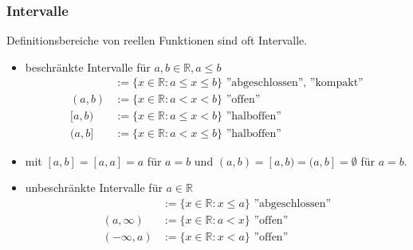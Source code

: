 \documentclass[12pt]{article}
\begin{document}
\subsubsection{Intervalle}
Definitionsbereiche von reellen Funktionen sind oft Intervalle. 
\begin{itemize}
    \item beschränkte Intervalle für $a, b \in \mathbb{R}, a \leq b$
    \begin{align*}
        [a,b] &:= \{x \in \mathbb{R} : a \leq x \leq b\} \text{ ''abgeschlossen'', ''kompakt''} \\
        (a,b) &:= \{x \in \mathbb{R} : a < x < b\} \text{ ''offen''} \\
        [a,b) &:= \{x \in \mathbb{R} : a \leq x < b\} \text{ ''halboffen''} \\
        (a,b] &:= \{x \in \mathbb{R} : a < x \leq b\} \text{ ''halboffen''} 
    \end{align*}
    \item[] mit $[a,b] = [a, a] = {a}$ für $a = b$ und $(a,b) = [a,b) = (a,b] = \emptyset$ für $a = b$.
    \item unbeschränkte Intervalle für $a \in \mathbb{R}$
    \begin{align*}
        [a,\infty) &:= \{x \in \mathbb{R}: a \leq x\} \text{ ''abgeschlossen''} \\
        (-\infty, a] &:= \{x \in \mathbb{R}: x \leq a\} \text{ ''abgeschlossen''} \\
        (a,\infty) &:= \{x \in \mathbb{R}: a < x\} \text{ ''offen''} \\
        (-\infty, a) &:= \{x \in \mathbb{R}: x < a\} \text{ ''offen''} 
    \end{align*}
\end{itemize}
\end{document}
